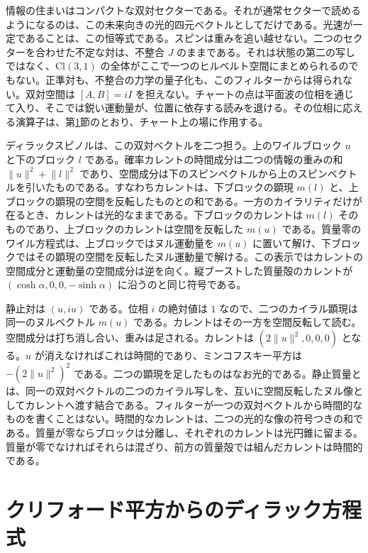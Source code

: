 \documentclass[a4paper]{article}
\begin{document}
情報の住まいはコンパクトな双対セクターである。それが通常セクターで読めるようになるのは、この未来向きの光的四元ベクトルとしてだけである。光速が一定であることは、この恒等式である。スピンは重みを追い越せない。二つのセクターを合わせた不定な対は、不整合 $J$ のままである。それは状態の第二の写しではなく、$\mathrm{Cl}(3,1)$ の全体がここで一つのヒルベルト空間にまとめられるのでもない。正準対も、不整合の力学の量子化も、このフィルターからは得られない。双対空間は $[A,B]=iI$ を担えない。チャートの点は平面波の位相を通じて入り、そこでは鋭い運動量が、位置に依存する読みを退ける。その位相に応える演算子は、第\ref{sec:dirac}節のとおり、チャート上の場に作用する。

ディラックスピノルは、この双対ベクトルを二つ担う。上のワイルブロック \(u\) と下のブロック \(l\) である。確率カレントの時間成分は二つの情報の重みの和 \(\lVert u\rVert^2+\lVert l\rVert^2\) であり、空間成分は下のスピンベクトルから上のスピンベクトルを引いたものである。すなわちカレントは、下ブロックの顕現 \(m(l)\) と、上ブロックの顕現の空間を反転したものとの和である。一方のカイラリティだけが在るとき、カレントは光的なままである。下ブロックのカレントは \(m(l)\) そのものであり、上ブロックのカレントは空間を反転した \(m(u)\) である。質量零のワイル方程式は、上ブロックではヌル運動量を \(m(u)\) に置いて解け、下ブロックではその顕現の空間を反転したヌル運動量で解ける。この表示ではカレントの空間成分と運動量の空間成分は逆を向く。縦ブーストした質量殻のカレントが \((\cosh\alpha,0,0,-\sinh\alpha)\) に沿うのと同じ符号である。

静止対は \((u,iu)\) である。位相 \(i\) の絶対値は \(1\) なので、二つのカイラル顕現は同一のヌルベクトル \(m(u)\) である。カレントはその一方を空間反転して読む。空間成分は打ち消し合い、重みは足される。カレントは \((2\lVert u\rVert^2,0,0,0)\) となる。\(u\) が消えなければこれは時間的であり、ミンコフスキー平方は \(-(2\lVert u\rVert^2)^2\) である。二つの顕現を足したものはなお光的である。静止質量とは、同一の双対ベクトルの二つのカイラル写しを、互いに空間反転したヌル像としてカレントへ渡す結合である。フィルターが一つの双対ベクトルから時間的なものを書くことはない。時間的なカレントは、二つの光的な像の符号つきの和である。質量が零ならブロックは分離し、それぞれのカレントは光円錐に留まる。質量が零でなければそれらは混ざり、前方の質量殻では組んだカレントは時間的である。

\section{クリフォード平方からのディラック方程式}
\label{sec:dirac}
\end{document}
